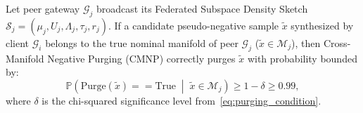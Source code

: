 \begin{lemma}
\label{lem:purging_invariance}
Let peer gateway $\mathcal{G}_j$ broadcast its Federated Subspace Density Sketch $\mathcal{S}_j = (\mu_j, U_j, \Lambda_j, \tau_j, r_j)$. If a candidate pseudo-negative sample $\tilde{x}$ synthesized by client $\mathcal{G}_i$ belongs to the true nominal manifold of peer $\mathcal{G}_j$ ($\tilde{x} \in \mathcal{M}_j$), then Cross-Manifold Negative Purging (CMNP) correctly purges $\tilde{x}$ with probability bounded by:
\begin{equation}
\label{eq:lem1_bound}
\mathbb{P}\left(\text{Purge}(\tilde{x}) == \text{True} \;\middle|\; \tilde{x} \in \mathcal{M}_j \right) \ge 1 - \delta \ge 0.99,
\end{equation}
where $\delta$ is the chi-squared significance level from~\eqref{eq:purging_condition}.
\end{lemma}

